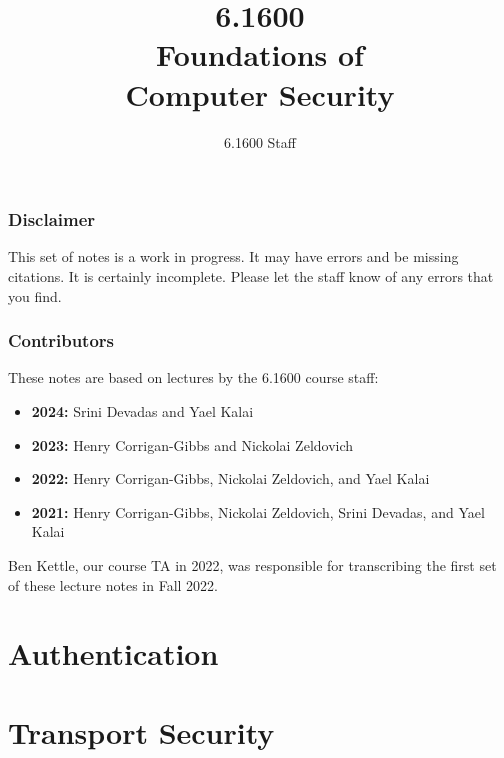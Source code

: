 \documentclass[
letterpaper, %
oneside,
nobib
]{tufte-book}
\author{6.1600 Staff}
\title{6.1600\\Foundations of\\Computer Security}
\begin{document}
\mainmatter

\maketitle

\section{Disclaimer}
This set of notes is a work in progress. It may have errors and be missing citations. It is certainly incomplete. Please let the staff know of any errors that you find.

\section{Contributors}
These notes are based on lectures by the 6.1600 course staff:
\begin{itemize}
  \item \textbf{2024:} Srini Devadas and Yael Kalai
  \item \textbf{2023:} Henry Corrigan-Gibbs and Nickolai Zeldovich
  \item \textbf{2022:} Henry Corrigan-Gibbs, Nickolai Zeldovich, and Yael Kalai
  \item \textbf{2021:} Henry Corrigan-Gibbs, Nickolai Zeldovich, Srini Devadas, and Yael Kalai
\end{itemize}
Ben Kettle, our course TA in 2022, was responsible for transcribing
the first set of these lecture notes in Fall 2022.

\clearpage

\tableofcontents*
\clearpage





\part{Authentication}








\part{Transport Security}





 
% 
\end{document}

